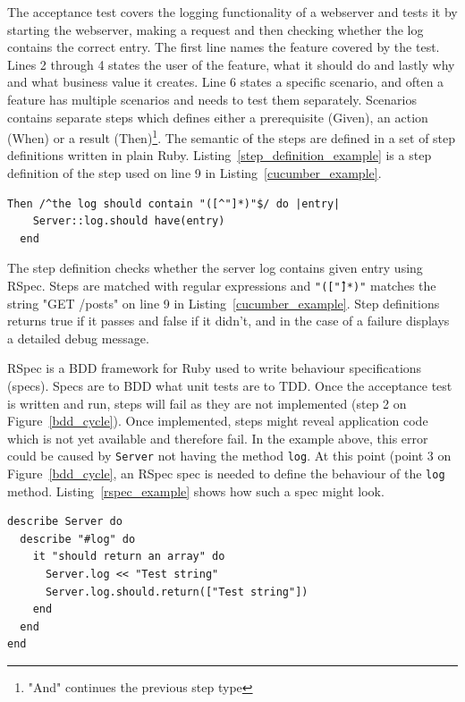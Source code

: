 The acceptance test covers the logging functionality of a webserver and tests it
by starting the webserver, making a request and then checking whether the log
contains the correct entry.  The first line names the feature covered by the
test. Lines 2 through 4 states the user of the feature, what it should do and
lastly why and what business value it creates. Line 6 states a specific
scenario, and often a feature has multiple scenarios and needs to test them
separately. Scenarios contains separate steps which defines either a
prerequisite (Given), an action (When) or a result (Then)\footnote{"And"
continues the previous step type}. The semantic of the steps are defined in a
set of step definitions written in plain Ruby.
Listing~\ref{step_definition_example} is a step definition of the step used on
line 9 in Listing~\ref{cucumber_example}.

\bigskip
\begin{lstlisting}[label=step_definition_example,caption=Cucumber step definition]
  Then /^the log should contain "([^"]*)"$/ do |entry|
    Server::log.should have(entry)
  end
\end{lstlisting}

The step definition checks whether the server log contains given entry using
RSpec. Steps are matched with regular expressions and \texttt{"([\^"]*)"}
matches the string "GET /posts" on line 9 in Listing~\ref{cucumber_example}.
Step definitions returns true if it passes and false if it didn't, and in the
case of a failure displays a detailed debug message.

RSpec is a BDD framework for Ruby used to write behaviour specifications
(specs). Specs are to BDD what unit tests are to TDD\@. Once the acceptance test is
written and run, steps will fail as they are not implemented (step 2 on
Figure~\ref{bdd_cycle}). Once implemented, steps might reveal application code
which is not yet available and therefore fail. In the example above, this error
could be caused by \texttt{Server} not having the method \texttt{log}. At this
point (point 3 on Figure~\ref{bdd_cycle}, an RSpec spec is needed to define the
behaviour of the \texttt{log} method. Listing~\ref{rspec_example} shows how such
a spec might look.

\bigskip
\begin{lstlisting}[label=rspec_example,caption=RSpec (spec) example]
describe Server do
  describe "#log" do
    it "should return an array" do
      Server.log << "Test string"
      Server.log.should.return(["Test string"])
    end
  end
end
\end{lstlisting}

